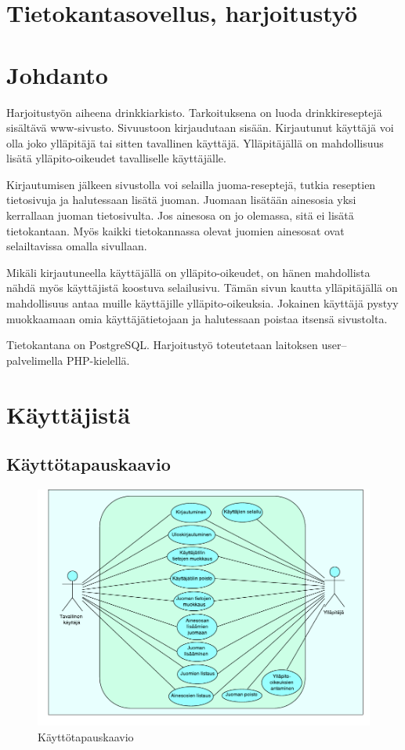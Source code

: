 \documentclass[a4paper]{article}
\begin{document}
\section*{Tietokantasovellus, harjoitustyö}

\tableofcontents

\section{Johdanto}

Harjoitustyön aiheena drinkkiarkisto. Tarkoituksena on luoda drinkkireseptejä sisältävä www-sivusto. Sivuustoon kirjaudutaan sisään. Kirjautunut käyttäjä voi olla joko ylläpitäjä tai sitten tavallinen käyttäjä. Ylläpitäjällä on mahdollisuus lisätä ylläpito-oikeudet tavalliselle käyttäjälle.   

Kirjautumisen jälkeen sivustolla voi selailla juoma-reseptejä, tutkia reseptien tietosivuja ja halutessaan lisätä juoman. Juomaan lisätään ainesosia yksi kerrallaan juoman tietosivulta. Jos ainesosa on jo olemassa, sitä ei lisätä tietokantaan. Myös kaikki tietokannassa olevat juomien ainesosat ovat selailtavissa omalla sivullaan. 

Mikäli kirjautuneella käyttäjällä on ylläpito-oikeudet, on hänen mahdollista nähdä myös käyttäjistä koostuva selailusivu. Tämän sivun  kautta ylläpitäjällä on mahdollisuus antaa muille käyttäjille ylläpito-oikeuksia. Jokainen käyttäjä pystyy muokkaamaan omia käyttäjätietojaan ja halutessaan poistaa itsensä sivustolta. 

Tietokantana on PostgreSQL. Harjoitustyö toteutetaan laitoksen user--palvelimella PHP-kielellä. 

\newpage
\section{Käyttäjistä}

\subsection{Käyttötapauskaavio}
\begin{figure}[h]
	
	\includegraphics[scale=0.9]{kayttotapaukset.pdf}
	\caption{Käyttötapauskaavio}
\end{figure}
	
\end{document}
